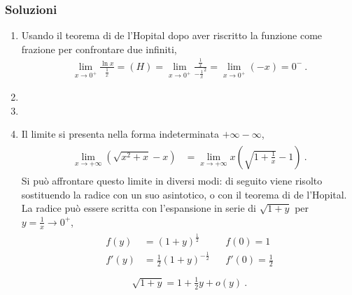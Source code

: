 \documentclass[letterpaper,10pt,italian]{jupyterBook}
\begin{document}
\subsubsection*{Soluzioni}
\begin{enumerate}
%
\item {} 
\sphinxAtStartPar
Usando il teorema di de l’Hopital dopo aver riscritto la funzione come frazione per confrontare due infiniti,
\begin{equation*}
\begin{split}\lim_{x \to 0^+} \frac{\ln x}{\frac{1}{x}} = (H) = \lim_{x \to 0^+} \frac{\frac{1}{x}}{-\frac{1}{x}^2} = \lim_{x \to 0^+} (-x) = 0^{-} \ .\end{split}
\end{equation*}
\item {} 
\item {} 
\item {} 
\sphinxAtStartPar
Il limite si presenta nella forma indeterminata \(+\infty - \infty\),
\begin{equation*}
\begin{split}\begin{aligned}
      \lim_{x \to +\infty} \left( \sqrt{x^2+x} - x \right)
      & = \lim_{x \to +\infty} x \left( \sqrt{1 + \frac{1}{x}} - 1 \right) \ .
    \end{aligned}\end{split}
\end{equation*}
\sphinxAtStartPar
Si può affrontare questo limite in diversi modi: di seguito viene risolto sostituendo la radice con un suo asintotico, o con il teorema di de l’Hopital. La radice può essere scritta con l’espansione in serie di \(\sqrt{1 + y}\) per \(y = \frac{1}{x} \to 0^+\),
\begin{equation*}
\begin{split}\begin{aligned}
      f (y) & = (1+y)^{\frac{1}{2}}             && f(0) = 1 \\
      f'(y) & = \frac{1}{2}(1+y)^{-\frac{1}{2}} && f'(0) = \frac{1}{2} \\
    \end{aligned}\end{split}
\end{equation*}\begin{equation*}
\begin{split}\sqrt{1 + y} = 1 + \frac{1}{2} y + o(y) \ .\end{split}
\end{equation*}

\end{enumerate}
\end{document}
